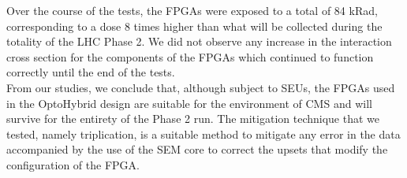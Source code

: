 Over the course of the tests, the FPGAs were exposed to a total of 84 kRad, corresponding to a dose 8 times higher than what will be collected during the totality of the LHC Phase 2. We did not observe any increase in the interaction cross section for the components of the FPGAs which continued to function correctly until the end of the tests. \\

From our studies, we conclude that, although subject to SEUs, the FPGAs used in the OptoHybrid design are suitable for the environment of CMS and will survive for the entirety of the Phase 2 run. The mitigation technique that we tested, namely triplication, is a suitable method to mitigate any error in the data accompanied by the use of the SEM core to correct the upsets that modify the configuration of the FPGA.
